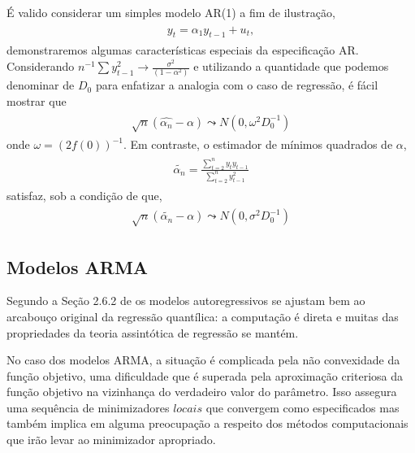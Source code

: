 \documentclass[paper=a4, fontsize=11pt]{scrartcl}
\numberwithin{equation}{section}		%
\numberwithin{figure}{section}			%
\numberwithin{table}{section}				%
\begin{document}
É valido considerar um simples modelo AR(1) a fim de ilustração,
\begin{align} 
	\begin{split}
	y_{t}=\alpha_{1}y_{t-1}+u_{t} \label{eq:modelo_AR_1},
	\end{split}					
\end{align}
{\parindent0pt demonstraremos algumas características especiais da especificação AR. Considerando $n^{-1}\sum y_{t-1}^2 \rightarrow \frac{\sigma^2}{(1-\alpha^2)}$ e utilizando a quantidade que podemos denominar de $D_{0}$ para enfatizar a analogia com o caso de regressão, é fácil mostrar que}
\begin{align} 
	\begin{split}
	\sqrt n (\hat{\alpha_{n}}-\alpha) \leadsto N(0,\omega^{2}D_{0}^{-1})
	\end{split}					
\end{align}
 {\parindent0pt onde $\omega = (2f(0))^{-1}$. Em contraste, o estimador de mínimos quadrados de $\alpha$,}
\begin{align} 
	\begin{split}
	\tilde{\alpha_{n}}=\frac{\sum_{t=2}^{n}y_{t}y_{t-1}}{\sum_{t=2}^{n}y_{t-1}^2}
	\end{split}					
\end{align}     
{\parindent0pt satisfaz, sob a condição de que,}
\begin{align} 
	\begin{split}
	\sqrt n (\tilde{\alpha_{n}}-\alpha) \leadsto N(0,\sigma^{2}D_{0}^{-1})
	\end{split}					
\end{align}   
 
\subsection{Modelos ARMA}
Segundo a Seção 2.6.2 de \cite{koenker2005quantile} os modelos autoregressivos se ajustam bem ao arcabouço original da regressão quantílica: a computação é direta e muitas das propriedades da teoria assintótica de regressão se mantém.

No caso dos modelos ARMA, a situação é complicada pela não convexidade da função objetivo, uma dificuldade que é superada pela aproximação criteriosa da função objetivo na vizinhança do verdadeiro valor do parâmetro. Isso assegura uma sequência de minimizadores $locais$ que convergem como especificados mas também implica em alguma preocupação a respeito dos métodos computacionais que irão levar ao minimizador apropriado. 
\end{document}
